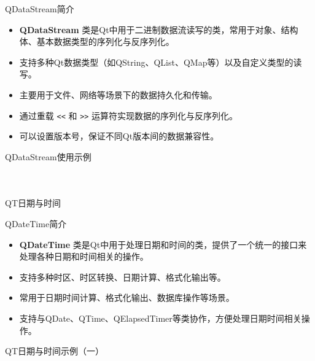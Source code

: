 \documentclass[UTF8,aspectratio=169]{beamer}
\begin{document}
\begin{frame}[fragile]{QDataStream简介}
    \begin{itemize}
        \item \textbf{QDataStream} 类是Qt中用于二进制数据流读写的类，常用于对象、结构体、基本数据类型的序列化与反序列化。
        \item 支持多种Qt数据类型（如QString、QList、QMap等）以及自定义类型的读写。
        \item 主要用于文件、网络等场景下的数据持久化和传输。
        \item 通过重载 \texttt{<<} 和 \texttt{>>} 运算符实现数据的序列化与反序列化。
        \item 可以设置版本号，保证不同Qt版本间的数据兼容性。
    \end{itemize}
\end{frame}

\begin{frame}[fragile]{QDataStream使用示例}
    \begin{columns}
        \begin{column}{0.48\textwidth}
            \inputminted[firstline=1,lastline=23]{cpp}{code/qt_datastream_example.cpp}
        \end{column}
        \begin{column}{0.48\textwidth}
            \inputminted[firstline=24,lastline=42]{cpp}{code/qt_datastream_example.cpp}
        \end{column}
    \end{columns}
\end{frame}

\begin{frame}[fragile]{QT日期与时间}
    \begin{ytublock}{QDateTime简介}
    \begin{itemize}
        \item \textbf{QDateTime} 类是Qt中用于处理日期和时间的类，提供了一个统一的接口来处理各种日期和时间相关的操作。
        \item 支持多种时区、时区转换、日期计算、格式化输出等。
        \item 常用于日期时间计算、格式化输出、数据库操作等场景。
        \item 支持与QDate、QTime、QElapsedTimer等类协作，方便处理日期时间相关操作。
    \end{itemize}
    \end{ytublock}
\end{frame}

\begin{frame}[fragile]{QT日期与时间示例（一）}
    \begin{columns}
        \begin{column}{0.48\textwidth}
            \inputminted[firstline=1,lastline=19]{cpp}{code/qt_datetime_example.cpp}
        \end{column}
        \begin{column}{0.48\textwidth}
            \inputminted[firstline=20,lastline=32]{cpp}{code/qt_datetime_example.cpp}
        \end{column}
    \end{columns}
\end{frame}
\end{document}
